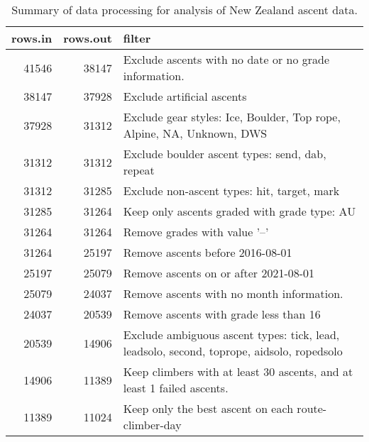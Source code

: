 \begin{table}[ht]
\centering
\begingroup\fontsize{9pt}{10pt}\selectfont
\begin{tabular}{rrl}
  \hline
{\bf rows.in} & {\bf rows.out} & {\bf filter} \\ 
  \hline
41546 & 38147 & Exclude ascents with no date or no grade information. \\ 
  38147 & 37928 & Exclude artificial ascents \\ 
  37928 & 31312 & Exclude gear styles: Ice, Boulder, Top rope, Alpine, NA, Unknown, DWS \\ 
  31312 & 31312 & Exclude boulder ascent types: send, dab, repeat \\ 
  31312 & 31285 & Exclude non-ascent types: hit, target, mark \\ 
  31285 & 31264 & Keep only ascents graded with grade type: AU \\ 
  31264 & 31264 & Remove grades with value '--' \\ 
  31264 & 25197 & Remove ascents before 2016-08-01 \\ 
  25197 & 25079 & Remove ascents on or after 2021-08-01 \\ 
  25079 & 24037 & Remove ascents with no month information. \\ 
  24037 & 20539 & Remove ascents with grade less than 16 \\ 
  20539 & 14906 & Exclude ambiguous ascent types: tick, lead, leadsolo, second, toprope, aidsolo, ropedsolo \\ 
  14906 & 11389 & Keep climbers with at least 30 ascents, and at least 1 failed ascents. \\ 
  11389 & 11024 & Keep only the best ascent on each route-climber-day \\ 
   \hline
\end{tabular}
\endgroup
\caption{Summary of data processing for analysis of New Zealand ascent data.} 
\label{table-data-processing-nz}
\end{table}
